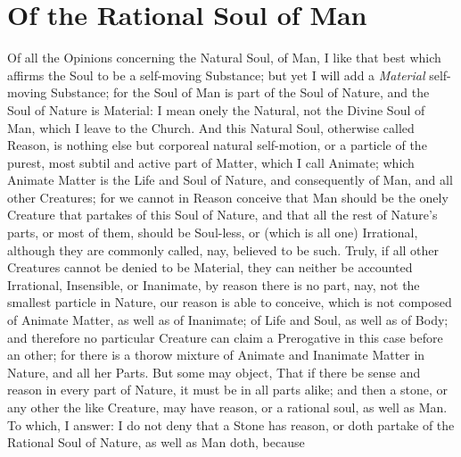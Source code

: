 
\author{Margaret Cavendish}
\chapter{Of the Rational Soul of Man}


Of all the Opinions concerning the Natural Soul, of Man, I
like that best which affirms the Soul to be a self-moving Substance;
but yet I will add a \textit{Material} self-moving Substance; for the
Soul of Man is part of the Soul of Nature, and the Soul of Nature is
Material: I mean onely the Natural, not the Divine Soul of Man, which
I leave to the Church. And this Natural Soul, otherwise called Reason,
is nothing else but corporeal natural self-motion, or a particle of
the purest, most subtil and active part of Matter, which I call
Animate; which Animate Matter is the Life and Soul of Nature, and
consequently of Man, and all other Creatures; for we cannot in
Reason conceive that Man should be the onely Creature that partakes of
this Soul of Nature, and that all the rest of Nature's parts, or most
of them, should be Soul-less, or (which is all one) Irrational,
although they are commonly called, nay, believed to be such. Truly, if
all other Creatures cannot be denied to be Material, they can neither
be accounted Irrational, Insensible, or Inanimate, by reason there is
no part, nay, not the smallest particle in Nature, our reason
 is able to conceive, which is not composed of Animate
Matter, as well as of Inanimate; of Life and Soul, as well as of Body;
and therefore no particular Creature can claim a Prerogative in this
case before an other; for there is a thorow mixture of Animate and
Inanimate Matter in Nature, and all her Parts. But some may object,
That if there be sense and reason in every part of Nature, it must
be in all parts alike; and then a stone, or any other the like
Creature, may have reason, or a rational soul, as well as Man. To
which, I answer: I do not deny that a Stone has reason, or doth
partake of the Rational Soul of Nature, as well as Man doth, because
